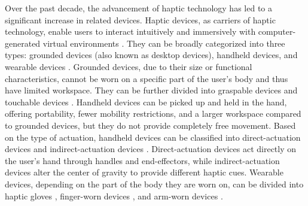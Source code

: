 \documentclass[sigconf,review,anonymous]{acmart}
\begin{document}
Over the past decade, the advancement of haptic technology has led to a significant increase in related devices. Haptic devices, as carriers of haptic technology, enable users to interact intuitively and immersively with computer-generated virtual environments \cite{sreelakshmi2017haptic}. They can be broadly categorized into three types: grounded devices (also known as desktop devices), handheld devices, and wearable devices \cite{adilkhanov2022haptic}. Grounded devices, due to their size or functional characteristics, cannot be worn on a specific part of the user's body and thus have limited workspace. They can be further divided into graspable devices \cite{adel2018rendering, zarate2020contact, feick2023voxelhap} and touchable devices \cite{adilkhanov2020vibero, goetz2020patch}. Handheld devices can be picked up and held in the hand, offering portability, fewer mobility restrictions, and a larger workspace compared to grounded devices, but they do not provide completely free movement. Based on the type of actuation, handheld devices can be classified into direct-actuation devices \cite{sakr2020haptic, chen2019haptivec} and indirect-actuation devices \cite{kovacs2020haptic}. Direct-actuation devices act directly on the user's hand through handles and end-effectors, while indirect-actuation devices alter the center of gravity to provide different haptic cues. Wearable devices, depending on the part of the body they are worn on, can be divided into haptic gloves \cite{ozioko2022smart}, finger-worn devices \cite{chinello2019modular, preechayasomboon2021haplets}, and arm-worn devices \cite{zhao2020wearable, pezent2022explorations}.
\end{document}
